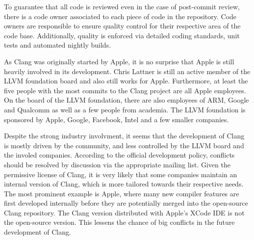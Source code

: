 To guarantee that all code is reviewed even in the case of post-commit review, there is a code owner associated to each piece of code in the repository. Code owners are responsible to ensure quality control for their respective area of the code base. Additionally, quality is enforced via detailed coding standards, unit tests and automated nightly builds.

As Clang was originally started by Apple, it is no surprise that Apple is still heavily involved in its development. Chris Lattner is still an active member of the LLVM foundation board and also still works for Apple.\cite{lattner} Furthermore, at least the five people with the most commits to the Clang project are all Apple employees.\cite{clang-commits} On the board of the LLVM foundation, there are also employees of ARM, Google and Qualcomm as well as a few people from academia.\cite{llvm-board} The LLVM foundation is sponsored by Apple, Google, Facebook, Intel and a few smaller companies.\cite{llvm-sponsors}

Despite the strong industry involvment, it seems that the development of Clang is mostly driven by the community, and less controlled by the LLVM board and the involed companies. According to the official development policy, conflicts should be resolved by discussion via the appropriate mailing list.\cite{clang-policy} Given the permissive license of Clang, it is very likely that some companies maintain an internal version of Clang, which is more tailored towards their respective needs. The most prominent example is Apple, where many new compiler features are first developed internally before they are potentially merged into the open-source Clang repository. The Clang version distributed with Apple's XCode IDE is not the open-source version. \cite{Clang in XCODE}
 This lessens the chance of big conflicts in the future development of Clang. 




